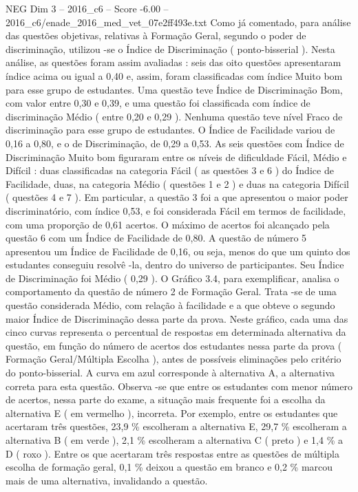 \begin{textsample}{NEG Dim 3 – 2016\_c6 – Score -6.00 – 2016\_c6/enade\_2016\_med\_vet\_07e2ff493e.txt}
Como já comentado, para análise das questões objetivas, relativas à Formação Geral, segundo o poder de discriminação, utilizou -se o Índice de Discriminação ( ponto-bisserial ).
Nesta análise, as questões foram assim avaliadas : seis das oito questões apresentaram índice acima ou igual a 0,40 e, assim, foram classificadas com índice Muito bom para esse grupo de estudantes.
Uma questão teve Índice de Discriminação Bom, com valor entre 0,30 e 0,39, e uma questão foi classificada com índice de discriminação Médio ( entre 0,20 e 0,29 ).
Nenhuma questão teve nível Fraco de discriminação para esse grupo de estudantes.
O Índice de Facilidade variou de 0,16 a 0,80, e o de Discriminação, de 0,29 a 0,53.
As seis questões com Índice de Discriminação Muito bom figuraram entre os níveis de dificuldade Fácil, Médio e Difícil : duas classificadas na categoria Fácil ( as questões 3 e 6 ) do Índice de Facilidade, duas, na categoria Médio ( questões 1 e 2 ) e duas na categoria Difícil ( questões 4 e 7 ).
Em particular, a questão 3 foi a que apresentou o maior poder discriminatório, com índice 0,53, e foi considerada Fácil em termos de facilidade, com uma proporção de 0,61 acertos.
O máximo de acertos foi alcançado pela questão 6 com um Índice de Facilidade de 0,80.
A questão de número 5 apresentou um Índice de Facilidade de 0,16, ou seja, menos do que um quinto dos estudantes conseguiu resolvê -la, dentro do universo de participantes.
Seu Índice de Discriminação foi Médio ( 0,29 ).
O Gráfico 3.4, para exemplificar, analisa o comportamento da questão de número 2 de Formação Geral.
Trata -se de uma questão considerada Médio, com relação à facilidade e a que obteve o segundo maior Índice de Discriminação dessa parte da prova.
Neste gráfico, cada uma das cinco curvas representa o percentual de respostas em determinada alternativa da questão, em função do número de acertos dos estudantes nessa parte da prova ( Formação Geral/Múltipla Escolha ), antes de possíveis eliminações pelo critério do ponto-bisserial.
A curva em azul corresponde à alternativa A, a alternativa correta para esta questão.
Observa -se que entre os estudantes com menor número de acertos, nessa parte do exame, a situação mais frequente foi a escolha da alternativa E ( em vermelho ), incorreta.
Por exemplo, entre os estudantes que acertaram três questões, 23,9 \% escolheram a alternativa E, 29,7 \% escolheram a alternativa B ( em verde ), 2,1 \% escolheram a alternativa C ( preto ) e 1,4 \% a D ( roxo ).
Entre os que acertaram três respostas entre as questões de múltipla escolha de formação geral, 0,1 \% deixou a questão em branco e 0,2 \% marcou mais de uma alternativa, invalidando a questão.

\end{textsample}

